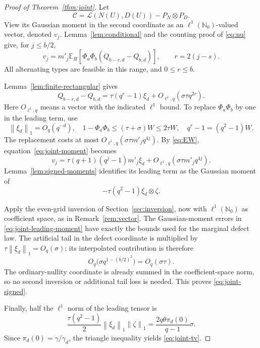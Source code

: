 \documentclass[11pt]{article}
\theoremstyle{definition}
\theoremstyle{remark}
\newcommand{\N}{\mathbb N}
\newcommand{\E}{\mathbb E}
\newcommand{\Law}{\mathcal L}
\newcommand{\normone}[1]{\left\|#1\right\|_1}
\begin{document}
\begin{proof}[Proof of Theorem~\ref{thm:joint}]
Let
\[
 \mathcal C=\Law(N(U),D(U))-P_N\otimes P_D.
\]
View its Gaussian moment in the second coordinate as an $\ell^1(\N_0)$-valued vector, denoted $v_j$. Lemma~\ref{lem:conditional} and the counting proof of \eqref{eq:nu} give, for $j\le b/2$,
\begin{equation}\label{eq:joint-moment}
 v_j=m'_j\E_H\left[\Phi_a\Phi_b
        (Q_{b-r,d}-Q_{b,d})\right],\qquad r=2(j-s).
\end{equation}
All alternating types are feasible in this range, and $0\le r\le b$.

Lemma~\ref{lem:finite-rectangular} gives
\begin{equation}\label{eq:conditional-expansion}
 Q_{b-r,d}-Q_{b,d}
 =\tau(q^r-1)\xi_d
       +O_{\ell^1,q}(\sigma\tau q^{2r}).
\end{equation}
Here $O_{\ell^1,q}$ means a vector with the indicated $\ell^1$ bound. To replace $\Phi_a\Phi_b$ by one in the leading term, use
\[
 \normone{\xi_d}=O_q(q^{-d}),\quad
 1-\Phi_a\Phi_b\le(\tau+\sigma)W\le2\tau W,\quad
 q^r-1=(q^2-1)W.
\]
The replacement costs at most $O_{\ell^1,q}(\sigma\tau m'_jq^{4j})$. By \eqref{eq:EW}, equation~\eqref{eq:joint-moment} becomes
\begin{equation}\label{eq:joint-leading-moment}
 v_j=\tau(q+1)(q^j-1)m'_j\xi_d
       +O_{\ell^1,q}(\sigma\tau m'_jq^{4j}).
\end{equation}
Lemma~\ref{lem:signed-moments} identifies its leading term as the Gaussian moment of
\[
 -\tau(q^2-1)\xi_d\otimes\zeta.
\]

Apply the even-grid inversion of Section~\ref{sec:inversion}, now with $\ell^1(\N_0)$ as coefficient space, as in Remark~\ref{rem:vector}. The Gaussian-moment errors in \eqref{eq:joint-leading-moment} have exactly the bounds used for the marginal defect law. The artificial tail in the defect coordinate is multiplied by $\tau\normone{\xi_d}=O_q(\sigma)$; its interpolated contribution is therefore
\[
 O_q\bigl(\sigma q^{1-(b/2)^2}\bigr)=O_q(\sigma\tau).
\]
The ordinary-nullity coordinate is already summed in the coefficient-space norm, so no second inversion or additional tail loss is needed. This proves \eqref{eq:joint-signed}.

Finally, half the $\ell^1$ norm of the leading tensor is
\[
 \frac{\tau(q^2-1)}2\normone{\xi_d}\normone{\zeta}
 =\frac{2q\theta\pi_d(0)}{q-1}\sigma.
\]
Since $\pi_d(0)=\gamma/\gamma_d$, the triangle inequality yields \eqref{eq:joint-tv}.
\end{proof}
\end{document}
